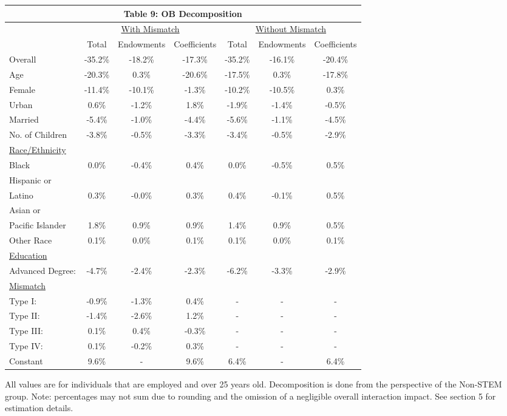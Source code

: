 \documentclass[11pt]{article}
\theoremstyle{definition}
\begin{document}
\small{
\vspace{2.5mm}
\noindent
\begin{center}
\begin{tabular}{l c c c c c c }
\hline\hline
\multicolumn{7}{c}{\textbf{Table 9: OB Decomposition }} \\
\hline
 & \multicolumn{3}{c}{\underline{With Mismatch}} & \multicolumn{3}{c}{\underline{Without Mismatch}} \\
 & Total & Endowments  & Coefficients & Total & Endowments  & Coefficients \\
\hline
Overall & -35.2\% & -18.2\% & -17.3\% &  -35.2\% & -16.1\% & -20.4\% \\
Age & -20.3\% & 0.3\% & -20.6\% & -17.5\% & 0.3\% &  -17.8\% \\
Female  & -11.4\% & -10.1\% & -1.3\% & -10.2\% & -10.5\% &  0.3\% \\
Urban & 0.6\% & -1.2\% & 1.8\% & -1.9\% & -1.4\% & -0.5\% \\
Married  & -5.4\% & -1.0\% & -4.4\% & -5.6\% & -1.1\% & -4.5\% \\
No. of Children & -3.8\% & -0.5\% & -3.3\% & -3.4\% & -0.5\% & -2.9\% \\
\underline{Race/Ethnicity}  & & & &  &  &  \\
Black & 0.0\% & -0.4\% & 0.4\% & 0.0\% & -0.5\% & 0.5\% \\
Hispanic or & & & &  &  &   \\
Latino & 0.3\% & -0.0\% & 0.3\% & 0.4\% & -0.1\% & 0.5\% \\
Asian or & & & &  &  &  \\
Pacific Islander & 1.8\% & 0.9\% & 0.9\% & 1.4\% & 0.9\% & 0.5\% \\
Other Race & 0.1\% & 0.0\% & 0.1\% & 0.1\% & 0.0\% & 0.1\% \\
\underline{Education}  &  &  & &  &  & \\
Advanced Degree:  & -4.7\% & -2.4\% & -2.3\% & -6.2\% & -3.3\% & -2.9\% \\
\underline{Mismatch}  &  &  & &  &  & \\
Type I:  & -0.9\% & -1.3\% & 0.4\% & - & - & - \\
Type II:  & -1.4\% & -2.6\% & 1.2\% & - & - & - \\
Type III:  & 0.1\% & 0.4\% & -0.3\% & - & - & - \\
Type IV:  & 0.1\% & -0.2\% & 0.3\%  & - & - & - \\
Constant & 9.6\% & - & 9.6\% & 6.4\% & - & 6.4\% \\
\hline\hline
\end{tabular} 
\end{center}} 
All values are for individuals that are employed and over 25 years old.  Decomposition is done from the perspective of the Non-STEM group.  Note: percentages may not sum due to rounding and the omission of a negligible overall interaction impact.  See section 5 for estimation details.
\end{document}
